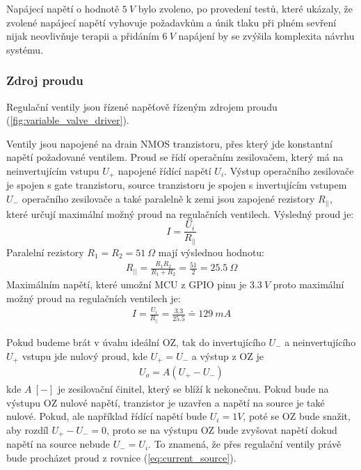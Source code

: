 Napájecí napětí o hodnotě $5 \ V$ bylo zvoleno, po provedení testů, které ukázaly, že zvolené napájecí napětí vyhovuje požadavkům a únik tlaku při plném sevření nijak neovlivňuje terapii a přidáním $6 \ V$ napájení by se zvýšila komplexita návrhu systému.

\subsubsection{Zdroj proudu}
Regulační ventily jsou řízené napěťově řízeným zdrojem proudu (\ref{fig:variable_valve_driver}).\par
Ventily jsou napojené na drain NMOS tranzistoru, přes který jde konstantní napětí požadované ventilem. Proud se řídí operačním zesilovačem, který má na neinvertujícím vstupu $U_+$ napojené řídící napětí $U_i$. Výstup operačního zesilovače je spojen s gate tranzistoru, source tranzistoru je spojen s invertujícím vstupem $U_-$ operačního zesilovače a také paralelně k zemi jsou zapojené rezistory $R_{||}$, které určují maximální možný proud na regulačních ventilech. Výsledný proud je:
\begin{equation}
    \label{eq:current_source}
    I = \frac{U_i}{R_{||}}
\end{equation}
Paralelní rezistory $R_1 = R_2 = 51 \ \Omega$ mají výslednou hodnotu:
\begin{align*}
    R_{||} = \frac{R_1 R_2}{R_1 + R_2} = \frac{51}{2} = 25.5 \ \Omega
\end{align*}
Maximálním napětí, které umožní MCU z GPIO pinu je $3.3 \ V$ proto maximální možný proud na regulačních ventilech je:
\begin{align*}
    I = \frac{U_i}{R_{||}} = \frac{3.3}{25.5} \doteq  129 \ mA
\end{align*}

Pokud budeme brát v úvahu ideální OZ, tak do invertujícího $U_-$ a neinvertujícího $U_+$ vstupu jde nulový proud, kde $U_+ = U_-$ a výstup z OZ je
\begin{align}
    U_o = A(U_+ - U_-)
\end{align}
kde $A \ [-] $ je zesilovační činitel, který se blíží k nekonečnu. Pokud bude na výstupu OZ nulové napětí, tranzistor je uzavřen a napětí na source je také nulové. Pokud, ale například řídící napětí bude  $U_i = 1V$, poté se OZ bude snažit, aby rozdíl $U_+ - U_- = 0$, proto se na výstupu OZ bude zvyšovat napětí dokud napětí na source nebude $U_- = U_i$. To znamená, že přes regulační ventily právě bude procházet proud z rovnice (\ref{eq:current_source}).

